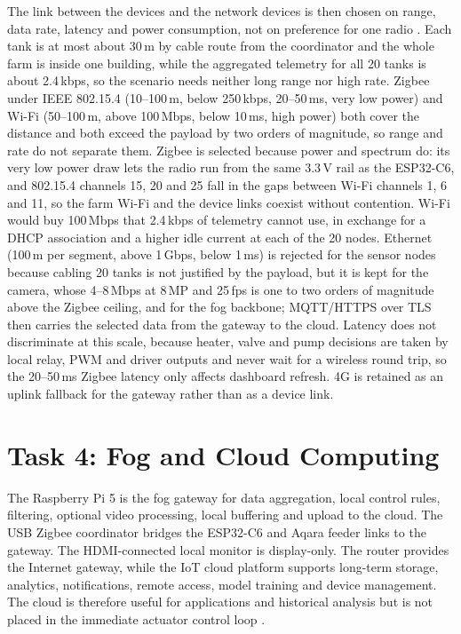 \documentclass[lang=en,11pt,a4paper,citestyle=apa,bibstyle=apa]{elegantpaper}
\begin{document}
The link between the devices and the network devices is then chosen on range, data rate, latency and power consumption, not on preference for one radio \parencite{Rayes2022}. Each tank is at most about 30\,m by cable route from the coordinator and the whole farm is inside one building, while the aggregated telemetry for all 20 tanks is about 2.4\,kbps, so the scenario needs neither long range nor high rate. Zigbee under IEEE 802.15.4 (10--100\,m, below 250\,kbps, 20--50\,ms, very low power) and Wi-Fi (50--100\,m, above 100\,Mbps, below 10\,ms, high power) both cover the distance and both exceed the payload by two orders of magnitude, so range and rate do not separate them. Zigbee is selected because power and spectrum do: its very low power draw lets the radio run from the same 3.3\,V rail as the ESP32-C6, and 802.15.4 channels 15, 20 and 25 fall in the gaps between Wi-Fi channels 1, 6 and 11, so the farm Wi-Fi and the device links coexist without contention. Wi-Fi would buy 100\,Mbps that 2.4\,kbps of telemetry cannot use, in exchange for a DHCP association and a higher idle current at each of the 20 nodes. Ethernet (100\,m per segment, above 1\,Gbps, below 1\,ms) is rejected for the sensor nodes because cabling 20 tanks is not justified by the payload, but it is kept for the camera, whose 4--8\,Mbps at 8\,MP and 25\,fps is one to two orders of magnitude above the Zigbee ceiling, and for the fog backbone; MQTT/HTTPS over TLS then carries the selected data from the gateway to the cloud. Latency does not discriminate at this scale, because heater, valve and pump decisions are taken by local relay, PWM and driver outputs and never wait for a wireless round trip, so the 20--50\,ms Zigbee latency only affects dashboard refresh. 4G is retained as an uplink fallback for the gateway rather than as a device link.

\begingroup
\footnotesize
\setlength{\tabcolsep}{1pt}
\setlength{\LTleft}{0pt}
\setlength{\LTright}{0pt}
\setlength{\LTcapwidth}{\textwidth}
\setlength{\LTpre}{0pt}
\setlength{\LTpost}{0pt}

\endgroup

\section{Task 4: Fog and Cloud Computing}

The Raspberry Pi 5 is the fog gateway for data aggregation, local control rules, filtering, optional video processing, local buffering and upload to the cloud. The USB Zigbee coordinator bridges the ESP32-C6 and Aqara feeder links to the gateway. The HDMI-connected local monitor is display-only. The router provides the Internet gateway, while the IoT cloud platform supports long-term storage, analytics, notifications, remote access, model training and device management. The cloud is therefore useful for applications and historical analysis but is not placed in the immediate actuator control loop \parencite{RaspberryPi5,SONOFFZBDongleE}.
\end{document}
